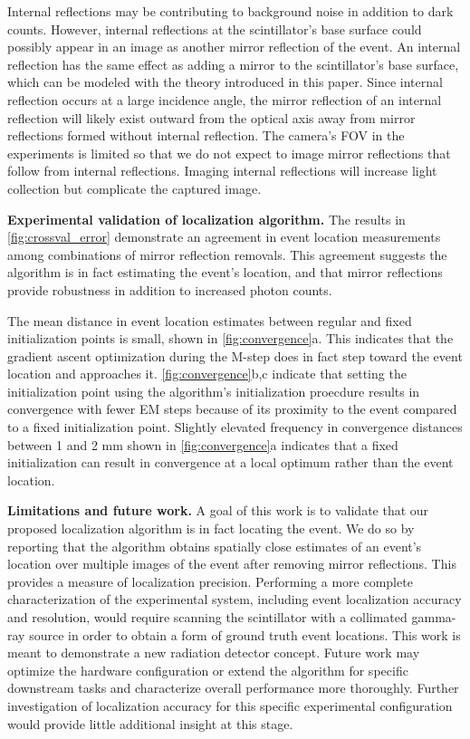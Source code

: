 Internal reflections may be contributing to background noise in addition to dark counts.
However, internal reflections at the scintillator's base surface could possibly 
appear in an image as another mirror reflection of the event.
An internal reflection has the same effect as adding a mirror to the 
scintillator's base surface, which can be modeled with the theory introduced in 
this paper.
Since internal reflection occurs at a large incidence angle, the 
mirror reflection of an internal reflection will likely exist 
outward from the optical axis away from mirror reflections formed 
without internal reflection. 
The camera's FOV in the experiments is limited so that we do not 
expect to image mirror reflections that follow from internal reflections.
Imaging internal reflections will increase light collection but complicate the 
captured image.

\noindent
\textbf{Experimental validation of localization algorithm.}
The results in \cref{fig:crossval_error} demonstrate an agreement in event 
location measurements among combinations of mirror reflection removals.
This agreement suggests the algorithm is in fact estimating the event's location, 
and that mirror reflections provide robustness in addition to increased photon counts.

The mean distance in event location estimates between regular and fixed 
initialization points is small, shown in \cref{fig:convergence}a.
This indicates that the gradient ascent optimization during the M-step does in 
fact step toward the event location and approaches it.
\cref{fig:convergence}b,c indicate that setting the initialization point using the 
algorithm's initialization proecdure results in convergence with fewer EM steps 
because of its proximity to the event compared to a fixed initialization point. 
Slightly elevated frequency in convergence distances between 1 and 2 mm shown in 
\cref{fig:convergence}a indicates that a fixed initialization can result in 
convergence at a local optimum rather than the event location.

\noindent
\textbf{Limitations and future work.}
A goal of this work is to validate that our proposed localization algorithm is in 
fact locating the event.
We do so by reporting that the algorithm obtains spatially close estimates of an 
event's location over multiple images of the event after removing mirror reflections.
This provides a measure of localization precision.
Performing a more complete characterization of the experimental system, 
including event localization accuracy and resolution, 
would require scanning the scintillator with a collimated gamma-ray source in
order to obtain a form of ground truth event locations.
This work is meant to demonstrate a new radiation detector concept.
Future work may optimize the hardware configuration or extend the algorithm for 
specific downstream tasks and characterize overall performance more thoroughly.
Further investigation of localization accuracy for this specific experimental 
configuration would provide little additional insight at this stage.

